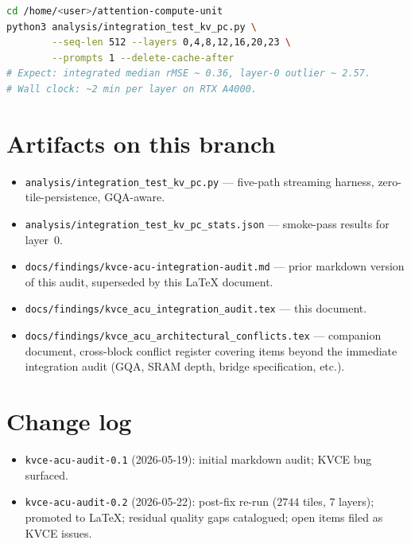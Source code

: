 \documentclass[11pt]{article}
\begin{document}
\begin{lstlisting}[language=bash,basicstyle=\ttfamily\small]
cd /home/<user>/attention-compute-unit
python3 analysis/integration_test_kv_pc.py \
        --seq-len 512 --layers 0,4,8,12,16,20,23 \
        --prompts 1 --delete-cache-after
# Expect: integrated median rMSE ~ 0.36, layer-0 outlier ~ 2.57.
# Wall clock: ~2 min per layer on RTX A4000.
\end{lstlisting}

\section{Artifacts on this branch}
\label{sec:artifacts}

\begin{itemize}
\item \texttt{analysis/integration\_test\_kv\_pc.py} --- five-path
streaming harness, zero-tile-persistence, GQA-aware.
\item \texttt{analysis/integration\_test\_kv\_pc\_stats.json} ---
smoke-pass results for layer~$0$.
\item \texttt{docs/findings/kvce-acu-integration-audit.md} ---
prior markdown version of this audit, superseded by this LaTeX
document.
\item \texttt{docs/findings/kvce\_acu\_integration\_audit.tex} ---
this document.
\item \texttt{docs/findings/kvce\_acu\_architectural\_conflicts.tex} ---
companion document, cross-block conflict register covering items
beyond the immediate integration audit (GQA, SRAM depth, bridge
specification, etc.).
\end{itemize}

\section*{Change log}

\begin{itemize}
\item \texttt{kvce-acu-audit-0.1} (2026-05-19): initial markdown
audit; KVCE bug surfaced.
\item \texttt{kvce-acu-audit-0.2} (2026-05-22): post-fix re-run
($2744$ tiles, $7$ layers); promoted to LaTeX; residual quality
gaps catalogued; open items filed as KVCE issues.
\end{itemize}
\end{document}
